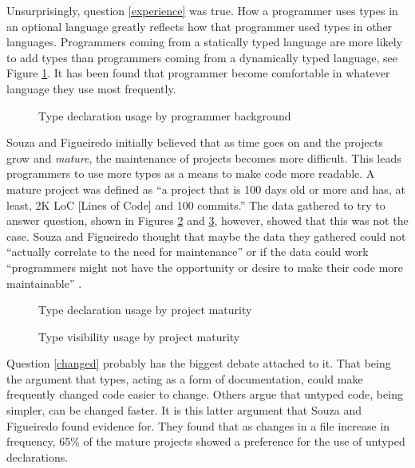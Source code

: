 \documentclass{sig-alternate}
\begin{document}
Unsurprisingly, question \ref{experience} was true. How a programmer uses types in an optional language greatly reflects how that programmer used types in other languages. Programmers coming from a statically typed language are more likely to add types than programmers coming from a dynamically typed language, see Figure \ref{Background}. It has been found that programmer become comfortable in whatever language they use most frequently.

\begin{figure}
\centering
{}
\caption{Type declaration usage by programmer background}
\label{Background}
\end{figure}

Souza and Figueiredo initially believed that as time goes on and the projects grow and \emph{mature}, the maintenance of projects becomes more difficult. This leads programmers to use more types as a means to make code more readable. A mature project was defined as ``a project that is 100 days old or more and has, at least, 2K LoC [Lines of Code] and 100 commits.''\cite{Souza2014}
The data gathered to try to answer question, shown in Figures \ref{Maturetype} and \ref{Matureview}, however, showed that this was not the case. Souza and Figueiredo thought that maybe the data they gathered could not ``actually correlate to the need for maintenance'' or if the data could work ``programmers might not have the opportunity or desire to make their code more maintainable'' \cite{Souza2014}.
\begin{figure}
\centering
{}
\caption{Type declaration usage by project maturity}
\label{Maturetype}
\end{figure}
\begin{figure}
\centering
{}
\caption{Type visibility usage by project maturity}
\label{Matureview}
\end{figure}

Question \ref{changed} probably has the biggest debate attached to it. That being the argument that types, acting as a form of documentation, could make frequently changed code easier to change. Others argue that untyped code, being simpler, can be changed faster. It is this latter argument that Souza and Figueiredo found evidence for. They found that as changes in a file increase in frequency, 65\% of the mature projects showed a preference for the use of untyped declarations.
\end{document}
